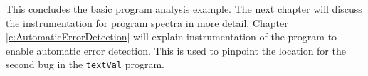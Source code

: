 	This concludes the basic program analysis example.
	The next chapter will discuss the instrumentation for program spectra in more detail.
	Chapter \ref{c:AutomaticErrorDetection} will explain instrumentation of the program
	to enable automatic error detection.
	This is used to pinpoint the location for the second bug in the \verb|textVal| program.

	
	













